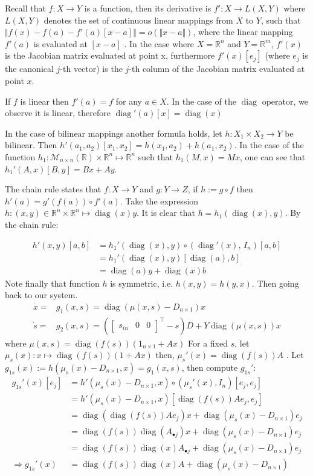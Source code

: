 \documentclass[processes,article,submit,moreauthors,pdftex]{Definitions/mdpi}
\newcommand{\R}{\mathbb{R}}
\DeclareMathOperator{\diag}{diag}
\begin{document}
Recall that $f:X\rightarrow Y$ is a function, then its derivative is $f':X \rightarrow L(X,Y)$ where $L(X,Y)$ denotes the set of continuous linear mappings from $X$ to $Y$, such that $\Vert f(x)-f(a) -f'(a)[x-a] \Vert = o(\Vert x-a \Vert) $, where the linear mapping $f'(a)$ is evaluated at $[x-a]$ \cite{cartan1971differential}. In the case where $X=\R^n$ and $Y = \R^m$, $f'(x)$ is the Jacobian matrix evaluated at point x, furthermore $f'(x)[e_j]$ (where $e_j$ is the canonical $j$-th vector) is the $j$-th column of the Jacobian matrix evaluated at point $x$. 

If $f$ is linear then $f'(a)= f$ for any $a \in X$. In the case of the $\diag$ operator, we observe it is linear, therefore $\diag'(a)[x]= \diag(x) $

In the case of bilinear mappings another formula holds, let $h: X_1 \times X_2 \rightarrow Y$ be bilinear. Then $h'(a_1,a_2)[x_1,x_2] = h(x_1,a_2) + h(a_1,x_2)$.
In the case of the function $h_1: \mathcal{M}_{n\times n}(\R) \times \R^n \mapsto \R^n$ such that $h_1(M,x) = Mx$, one can see that $h_1'(A,x)[B,y] = Bx + Ay$.


The chain rule states that $f:X \rightarrow Y$ and $g: Y\rightarrow Z$, if $h:= g \circ f$ then $h'(a) = g'(f(a))\circ f'(a)$. 
Take the expression $h: (x,y)\in \R^n\times \R^n \mapsto \diag(x)y$. It is clear that $h = h_1(\diag(x), y) $. By the chain rule:

\begin{align}
h'(x,y)[a,b] &= h_1'(\diag(x),y)\circ( \diag'(x), \, I_n)[a,b] \\
& = h_1'(\diag(x),y)[ \diag(a), b] \\
&= \diag(a)y + \diag(x)b
\end{align}
Note finally that function $h$ is symmetric, i.e. $h(x,y) = h(y,x)$.
Then going back to our system.
\begin{align}
\dot{x} = & g_1(x,s)= \diag(\mu(x,s) - D_{n\times 1})x \\
\dot{s} = & g_2(x,s)= \left(\begin{bmatrix} s_{in}&0&0 \end{bmatrix}^\top-s\right)D + Y\diag(\mu(x,s))x
\end{align} 
where $\mu(x,s) = \diag(f(s))(1_{n\times 1}+Ax)$
For a fixed $s$, let $\mu_s(x): x \mapsto  \diag(f(s))(1+Ax)$ then, $\mu_s'(x) = \diag(f(s))A$ . Let $g_{1s}(x):= h(\mu_s(x) - D_{n\times 1},x)=g_1(x,s)$, then compute $g_{1s}'$:
\begin{align} 
g_{1s}'(x)[e_j]&=h'(\mu_s(x) - D_{n\times 1},x) \circ (\mu_s'(x),I_n)[e_j, e_j]\\
&=h'(\mu_s(x)- D_{n\times 1},x) [\diag(f(s))Ae_j , e_j]  \\
&=\diag(\diag(f(s))Ae_j)x +  \diag(\mu_s(x)- D_{n\times 1})e_j \\
&=\diag(f(s))\diag(A_{\bullet j})x +  \diag(\mu_s(x)- D_{n\times 1})e_j \\
&=\diag(f(s))\diag(x)A_{\bullet j} +  \diag(\mu_s(x)- D_{n\times 1})e_j \\
\Rightarrow  g_{1s}'(x) &= \diag(f(s))\diag(x)A +  \diag(\mu_s(x)- D_{n\times 1})
\end{align}
\end{document}
